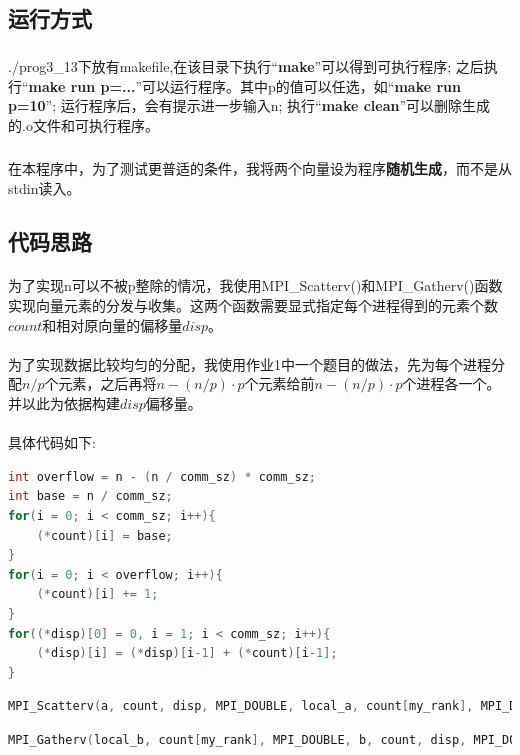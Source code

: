 \documentclass[UTF8, onecolumn, a4paper]{article}
\begin{document}
\subsection{运行方式}
\subparagraph*{}
./prog3\_13下放有makefile,在该目录下执行“\textbf{make}”可以得到可执行程序; 之后执行“\textbf{make run p=...}”可以运行程序。其中p的值可以任选，如“\textbf{make run p=10}”; 运行程序后，会有提示进一步输入n; 执行“\textbf{make clean}”可以删除生成的.o文件和可执行程序。
\subparagraph*{}
在本程序中，为了测试更普适的条件，我将两个向量设为程序\textbf{随机生成}，而不是从stdin读入。
\subsection{代码思路}
\paragraph*{}
为了实现n可以不被p整除的情况，我使用MPI\_Scatterv()和MPI\_Gatherv()函数实现向量元素的分发与收集。这两个函数需要显式指定每个进程得到的元素个数$count$和相对原向量的偏移量$disp$。
\paragraph*{}
为了实现数据比较均匀的分配，我使用作业1中一个题目的做法，先为每个进程分配$n/p$个元素，之后再将$n - (n/p)\cdot p$个元素给前$n - (n/p)\cdot p$个进程各一个。并以此为依据构建$disp$偏移量。
\paragraph*{}
具体代码如下:
\begin{lstlisting}[language={c}, title={Allocate\_count\_disp()}] 
int overflow = n - (n / comm_sz) * comm_sz;
int base = n / comm_sz;
for(i = 0; i < comm_sz; i++){
	(*count)[i] = base;
}
for(i = 0; i < overflow; i++){
	(*count)[i] += 1;
}
for((*disp)[0] = 0, i = 1; i < comm_sz; i++){
	(*disp)[i] = (*disp)[i-1] + (*count)[i-1];
}
\end{lstlisting}
\begin{lstlisting}[language={c}, title={Read\_vector()}] 
MPI_Scatterv(a, count, disp, MPI_DOUBLE, local_a, count[my_rank], MPI_DOUBLE, 0, comm);
\end{lstlisting}
\begin{lstlisting}[language={c}, title={Print\_vector()}] 
MPI_Gatherv(local_b, count[my_rank], MPI_DOUBLE, b, count, disp, MPI_DOUBLE, 0, comm);
\end{lstlisting}
\end{document}

